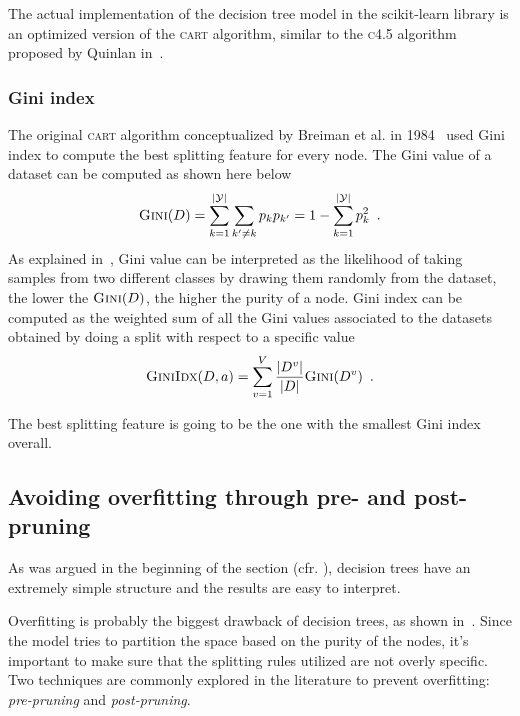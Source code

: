 \smallskip

The actual implementation of the decision tree model in the scikit-learn library is an optimized version of the \textsc{cart} algorithm, similar to the \textsc{c4.5} algorithm proposed by Quinlan in~\cite{quinlan2014c4}.

\subsubsection{Gini index}
The original \textsc{cart} algorithm conceptualized by Breiman et al. in
1984~\cite{breiman1984classification} used Gini index to compute the best splitting feature for
every node. The Gini value of a dataset can be computed as shown here below
\begin{equation}
	\label{eq:gini-value}
	\textsc{Gini}(D) = \sum_{k = 1}^{|\mathcal{Y}|}\sum_{k' \neq k} p_kp_{k'} = 1 - \sum_{k =
		1}^{|\mathcal{Y}|}p_k^2 \enspace.
\end{equation}
As explained in~\cite{ZhouZhi-Hua2021ML}, Gini value can be interpreted as the
likelihood of taking samples from two different classes by drawing them randomly from the
dataset, the lower the $\textsc{Gini}(D)$, the higher the purity of a node. Gini index can be
computed as the weighted sum of all the Gini values associated to the datasets obtained by doing a
split with respect to a specific value
\begin{equation}
	\label{eq:gini-index}
	\textsc{GiniIdx}(D,a) = \sum_{v = 1}^V\frac{|D^v|}{|D|} \textsc{Gini}(D^v) \enspace.
\end{equation}

The best splitting feature is going to be the one with the smallest Gini index overall.

\subsection{Avoiding overfitting through pre- and post- pruning}
As was argued in the beginning of the section (cfr. ), decision trees have an extremely simple structure and the results are easy to interpret.

Overfitting is probably the biggest drawback of decision trees, as shown in~\cite{overfitting-dt-erblin}. Since the model tries to partition the space based on the purity of the nodes, it's important to make sure that the splitting rules utilized are not overly specific. Two techniques are commonly explored in the literature to prevent overfitting: \emph{pre-pruning} and \emph{post-pruning}.

